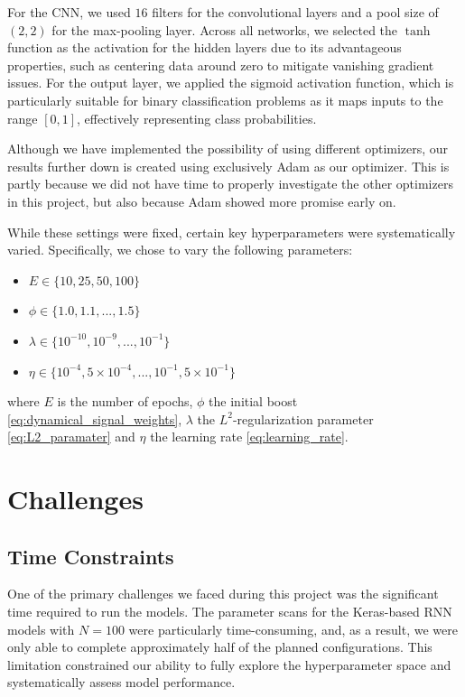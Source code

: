 \documentclass[%
reprint,
amsmath,amssymb,
aps,
]{revtex4-2}
\begin{document}
For the CNN, we used \(16\) filters for the convolutional layers and a pool size of \((2,2)\) for the max-pooling layer. Across all networks, we selected the \(\tanh\) function as the activation for the hidden layers due to its advantageous properties, such as centering data around zero to mitigate vanishing gradient issues. For the output layer, we applied the sigmoid activation function, which is particularly suitable for binary classification problems as it maps inputs to the range \([0,1]\), effectively representing class probabilities.

Although we have implemented the possibility of using different optimizers, our results further down is created using exclusively Adam as our optimizer. This is partly because we did not have time to properly investigate the other optimizers in this project, but also because Adam showed more promise early on. 

While these settings were fixed, certain key hyperparameters were systematically varied. Specifically, we chose to vary the following parameters:
\begin{itemize}
	\item $E\in\{10,25,50,100\}$
	\item $\phi\in\{1.0,1.1,...,1.5\}$
	\item $\lambda\in\{10^{-10},10^{-9},...,10^{-1}\}$
	\item $\eta\in\{10^{-4},5\times10^{-4},...,10^{-1},5\times10^{-1}\}$
\end{itemize}
where $E$ is the number of epochs, \(\phi\) the initial boost \eqref{eq:dynamical_signal_weights}, \(\lambda\) the \(L^2\)-regularization parameter \eqref{eq:L2_paramater} and \(\eta\) the learning rate \eqref{eq:learning_rate}.



\section{Challenges}
\label{sec:challenges}

\subsection{Time Constraints}
One of the primary challenges we faced during this project was the significant time required to run the models. The parameter scans for the Keras-based RNN models with $N=100$ were particularly time-consuming, and, as a result, we were only able to complete approximately half of the planned configurations. This limitation constrained our ability to fully explore the hyperparameter space and systematically assess model performance.
\end{document}
